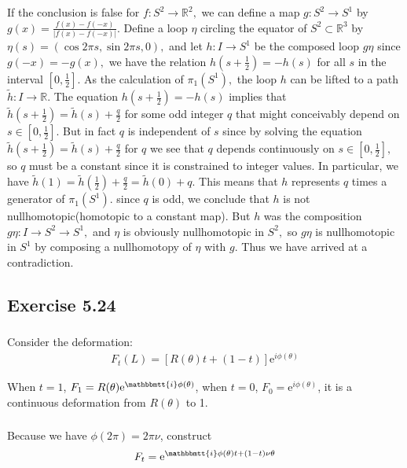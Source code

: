 \documentclass[]{ctexart}
\newcommand{\mi}{\mathbbmtt{i}}
\newcommand{\me}{\mathrm{e}}
\begin{document}
		 If the conclusion is false for $f: S^{2} \rightarrow \mathbb{R}^{2},$ we can define a map $g: S^{2} \rightarrow S^{1}$ by $g(x)=\frac{f(x)-f(-x)}{|f(x)-f(-x)|}.$ Define a loop $\eta$ circling the equator of $S^{2} \subset \mathbb{R}^{3}$ by $\eta(s)=(\cos 2 \pi s, \sin 2 \pi s, 0),$ and let $h: I \rightarrow S^{1}$ be the composed loop $g \eta$
		since $g(-x)=-g(x),$ we have the relation $h(s+\frac{1}{2})=-h(s)$ for all $s$ in the interval $[0,\frac{1}{2}] .$ As the calculation of $\pi_{1}\left(S^{1}\right),$ the loop $h$ can be lifted to a path $\tilde{h}: I \rightarrow \mathbb{R} .$ The equation $h(s+\frac{1}{2})=-h(s)$ implies that $\tilde{h}(s+\frac{1}{2})=\tilde{h}(s)+\frac{q}{2}$ for
		some odd integer $q$ that might conceivably depend on $s \in[0,\frac{1}{2}] .$ But in fact $q$ is independent of $s$ since by solving the equation $\tilde{h}(s+\frac{1}{2})=\tilde{h}(s)+\frac{q}{2}$ for $q$ we see that $q$ depends continuously on $s \in[0,\frac{1}{2}],$ so $q$ must be a constant since it is constrained to integer values. In particular, we have $\tilde{h}(1)=\tilde{h}(\frac{1}{2})+\frac{q}{2}=\tilde{h}(0)+q .$ This means that $h$ represents $q$ times a generator of $\pi_{1}\left(S^{1}\right) .$ since $q$ is odd, we conclude that $h$ is not nullhomotopic(homotopic
		to a constant map). But $h$ was the composition $g \eta: I \rightarrow S^{2} \rightarrow S^{1},$ and $\eta$ is obviously nullhomotopic in $S^{2},$ so $g \eta$ is nullhomotopic in $S^{1}$ by composing a nullhomotopy of $\eta$ with $g$. Thus we have arrived at a contradiction.
	\subsection{Exercise 5.24}
		\subsubsection{}
			Consider the deformation:
				\begin{equation*}
				\begin{aligned}
					F_t(L)=[R(\theta)t+(1-t)]\me^{i\phi(\theta)}
				\end{aligned}
				\end{equation*}
			
			When $t=1$, $F_1=R(\theta)\me ^{\mi\phi(\theta)}$, when $t=0$, $F_0=\me^{i\phi(\theta)}$, it is a continuous deformation from $R(\theta)$ to 1.
		
		\subsubsection{}
			Because we have $ \phi(2\pi)=2\pi \nu $, construct
				\begin{equation*}
				\begin{aligned}
					F_t=\me^{\mi \phi(\theta)t+(1-t)\nu\theta}
				\end{aligned}
				\end{equation*}
			
\end{document}
